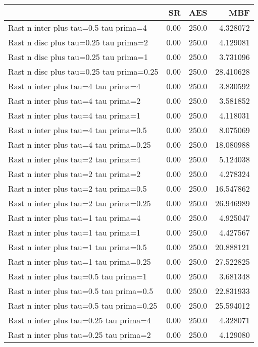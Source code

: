 \documentclass[11pt]{article}
\begin{document}
    \begin{tabular}{lrrr}
\toprule
{} &    SR &    AES &        MBF \\
\midrule
Rast n inter plus  tau=0.5 tau prima=4     &  0.00 &  250.0 &   4.328072 \\
Rast n disc  plus  tau=0.25 tau prima=2    &  0.00 &  250.0 &   4.129081 \\
Rast n disc  plus  tau=0.25 tau prima=1    &  0.00 &  250.0 &   3.731096 \\
Rast n disc  plus  tau=0.25 tau prima=0.25 &  0.00 &  250.0 &  28.410628 \\
Rast n inter plus  tau=4 tau prima=4       &  0.00 &  250.0 &   3.830592 \\
Rast n inter plus  tau=4 tau prima=2       &  0.00 &  250.0 &   3.581852 \\
Rast n inter plus  tau=4 tau prima=1       &  0.00 &  250.0 &   4.118031 \\
Rast n inter plus  tau=4 tau prima=0.5     &  0.00 &  250.0 &   8.075069 \\
Rast n inter plus  tau=4 tau prima=0.25    &  0.00 &  250.0 &  18.080988 \\
Rast n inter plus  tau=2 tau prima=4       &  0.00 &  250.0 &   5.124038 \\
Rast n inter plus  tau=2 tau prima=2       &  0.00 &  250.0 &   4.278324 \\
Rast n inter plus  tau=2 tau prima=0.5     &  0.00 &  250.0 &  16.547862 \\
Rast n inter plus  tau=2 tau prima=0.25    &  0.00 &  250.0 &  26.946989 \\
Rast n inter plus  tau=1 tau prima=4       &  0.00 &  250.0 &   4.925047 \\
Rast n inter plus  tau=1 tau prima=1       &  0.00 &  250.0 &   4.427567 \\
Rast n inter plus  tau=1 tau prima=0.5     &  0.00 &  250.0 &  20.888121 \\
Rast n inter plus  tau=1 tau prima=0.25    &  0.00 &  250.0 &  27.522825 \\
Rast n inter plus  tau=0.5 tau prima=1     &  0.00 &  250.0 &   3.681348 \\
Rast n inter plus  tau=0.5 tau prima=0.5   &  0.00 &  250.0 &  22.831933 \\
Rast n inter plus  tau=0.5 tau prima=0.25  &  0.00 &  250.0 &  25.594012 \\
Rast n inter plus  tau=0.25 tau prima=4    &  0.00 &  250.0 &   4.328071 \\
Rast n inter plus  tau=0.25 tau prima=2    &  0.00 &  250.0 &   4.129080 \\

\end{tabular}
\end{document}
